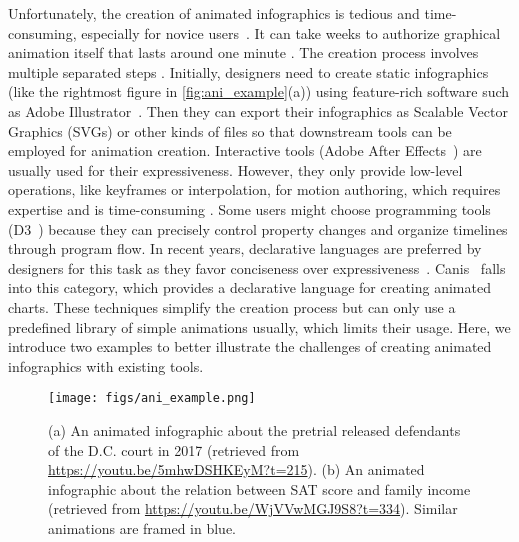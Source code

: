 Unfortunately, the creation of animated infographics is tedious and time-consuming, especially for novice users~\cite{amini2016authoring, hullman2013deeper, shi2021communicating}. %
It can take weeks to authorize graphical animation itself that lasts around one minute \cite{howlong}.
The creation process involves multiple separated steps \cite{jahanlou2020challenges, shi2021communicating}. %
Initially, designers need to create static infographics (like the rightmost figure in \autoref{fig:ani_example}(a)) using feature-rich software such as Adobe Illustrator~\cite{AdobeAI}.
Then they can export their infographics as Scalable Vector Graphics (SVGs) or other kinds of files so that downstream tools can be employed for animation creation.
Interactive tools (\eg Adobe After Effects~\cite{AdobeAE}) are usually used for their expressiveness.
However, they only provide low-level operations, like keyframes or interpolation, for motion authoring, which requires expertise and is time-consuming \cite{jahanlou2020challenges}.
Some users might choose programming tools (\eg D3~\cite{bostock2011d3}) because they can precisely control property changes and organize timelines through program flow.
In recent years, declarative languages are preferred by designers for this task as they favor conciseness over expressiveness~\cite{mcnutt2023nogrammar}. 
Canis~\cite{ge2020canis} falls into this category, which provides a declarative language for creating animated charts.
These techniques simplify the creation process but can only use a predefined library of simple animations usually, which limits their usage.
Here, we introduce two examples to better illustrate the challenges of creating animated infographics with existing tools.


\begin{figure}[h]
  \centering
  \texttt{[image: figs/ani\_example.png]}
  \caption{(a) An animated infographic about the pretrial released defendants of the D.C. court in 2017 (retrieved from \url{https://youtu.be/5mhwDSHKEyM?t=215}). (b) An animated infographic about the relation between SAT score and family income (retrieved from \url{https://youtu.be/WjVVwMGJ9S8?t=334}). Similar animations are framed in blue. }
  \label{fig:ani_example}
\end{figure}

